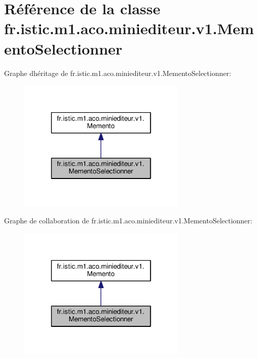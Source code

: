\hypertarget{classfr_1_1istic_1_1m1_1_1aco_1_1miniediteur_1_1v1_1_1MementoSelectionner}{}\section{Référence de la classe fr.\+istic.\+m1.\+aco.\+miniediteur.\+v1.\+Memento\+Selectionner}
\label{classfr_1_1istic_1_1m1_1_1aco_1_1miniediteur_1_1v1_1_1MementoSelectionner}


Graphe d\textquotesingle{}héritage de fr.\+istic.\+m1.\+aco.\+miniediteur.\+v1.\+Memento\+Selectionner\+:
\nopagebreak
\begin{figure}[H]
\begin{center}
\leavevmode
\includegraphics[width=226pt]{classfr_1_1istic_1_1m1_1_1aco_1_1miniediteur_1_1v1_1_1MementoSelectionner__inherit__graph}
\end{center}
\end{figure}


Graphe de collaboration de fr.\+istic.\+m1.\+aco.\+miniediteur.\+v1.\+Memento\+Selectionner\+:
\nopagebreak
\begin{figure}[H]
\begin{center}
\leavevmode
\includegraphics[width=226pt]{classfr_1_1istic_1_1m1_1_1aco_1_1miniediteur_1_1v1_1_1MementoSelectionner__coll__graph}
\end{center}
\end{figure}

